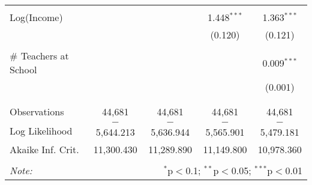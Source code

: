 \begin{table}[!htbp]
\begin{tabular}{@{\extracolsep{-2pt}}lcccc}
  & & & & \\ 
 Log(Income) &  &  & 1.448$^{***}$ & 1.363$^{***}$ \\ 
  &  &  & (0.120) & (0.121) \\ 
  & & & & \\ 
 \# Teachers at School &  &  &  & 0.009$^{***}$ \\ 
  &  &  &  & (0.001) \\ 
  & & & & \\ 
\hline \\[-1.8ex] 
Observations & 44,681 & 44,681 & 44,681 & 44,681 \\ 
Log Likelihood & $-$5,644.213 & $-$5,636.944 & $-$5,565.901 & $-$5,479.181 \\ 
Akaike Inf. Crit. & 11,300.430 & 11,289.890 & 11,149.800 & 10,978.360 \\ 
\hline 
\hline \\[-1.8ex] 
\textit{Note:}  & \multicolumn{4}{r}{$^{*}$p$<$0.1; $^{**}$p$<$0.05; $^{***}$p$<$0.01} \\ 
\end{tabular} 
\end{table} 
